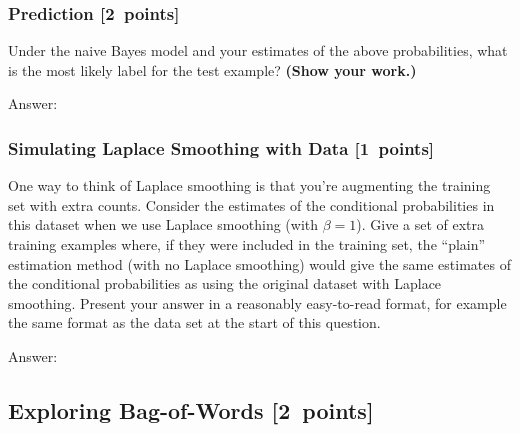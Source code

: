 \documentclass{article}
\newcommand{\blu}[1]{{\textcolor{blu}{#1}}}
\newenvironment{answer}{\par\begingroup\color{gre}Answer: }{\endgroup}
\let\ask\blu
\newcommand\pts[1]{\textcolor{pointscolour}{[#1~points]}}
\begin{document}
    \subsubsection{Prediction \pts{2}}

    \ask{Under the naive Bayes model and your estimates of the above probabilities, what is the most likely label for the test example? \textbf{(Show your work.)}}
    \begin{answer}

    \end{answer}
    \subsubsection{Simulating Laplace Smoothing with Data \pts{1}}
    \label{laplace.conceptual}

    One way to think of Laplace smoothing is that you're augmenting the training set with extra counts. Consider the estimates of the conditional probabilities in this dataset when we use Laplace smoothing (with $\beta = 1$).
    \ask{Give a set of extra training examples where, if they were included in the training set, the ``plain'' estimation method (with no Laplace smoothing) would give the same estimates of the conditional probabilities as using the original dataset with Laplace smoothing.}
    Present your answer in a reasonably easy-to-read format, for example the same format as the data set at the start of this question.
    \begin{answer}

    \end{answer}

    \clearpage
    \subsection{Exploring Bag-of-Words \pts{2}}
\end{document}
